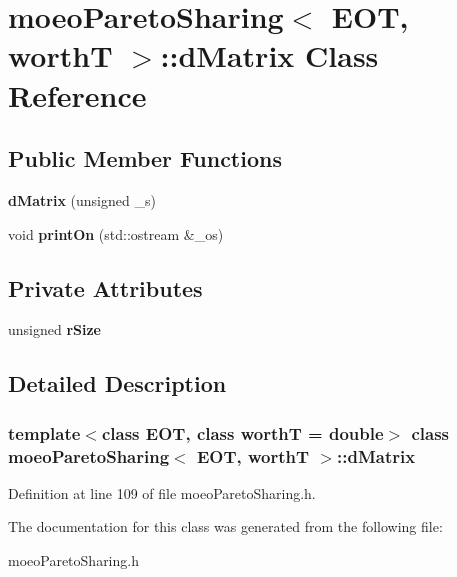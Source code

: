 \section{moeo\-Pareto\-Sharing$<$ EOT, worth\-T $>$::d\-Matrix Class Reference}
\label{classmoeoParetoSharing_1_1dMatrix}
\subsection*{Public Member Functions}
\begin{CompactItemize}
\item 
{\bf d\-Matrix} (unsigned \_\-s)\label{classmoeoParetoSharing_1_1dMatrix_97aa4b1596be7ddba2b52a43ebc4cb6a}

\item 
void {\bf print\-On} (std::ostream \&\_\-os)\label{classmoeoParetoSharing_1_1dMatrix_e63c5e6d70866a31eff53fab563922d7}

\end{CompactItemize}
\subsection*{Private Attributes}
\begin{CompactItemize}
\item 
unsigned {\bf r\-Size}\label{classmoeoParetoSharing_1_1dMatrix_792b8a45e222a0daecad1ed344fc9a4f}

\end{CompactItemize}


\subsection{Detailed Description}
\subsubsection*{template$<$class EOT, class worth\-T = double$>$ class moeo\-Pareto\-Sharing$<$ EOT, worth\-T $>$::d\-Matrix}





Definition at line 109 of file moeo\-Pareto\-Sharing.h.

The documentation for this class was generated from the following file:\begin{CompactItemize}
\item 
moeo\-Pareto\-Sharing.h\end{CompactItemize}

